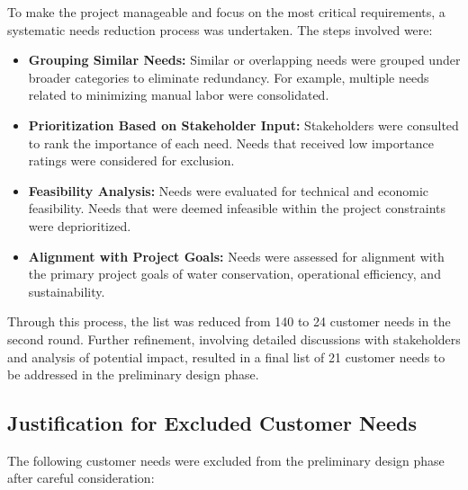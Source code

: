 \documentclass[12pt]{report}
\begin{document}
To make the project manageable and focus on the most critical requirements, a systematic needs reduction process was undertaken. The steps involved were:

\begin{itemize}
    \item \textbf{Grouping Similar Needs:} Similar or overlapping needs were grouped under broader categories to eliminate redundancy. For example, multiple needs related to minimizing manual labor were consolidated.
    \item \textbf{Prioritization Based on Stakeholder Input:} Stakeholders were consulted to rank the importance of each need. Needs that received low importance ratings were considered for exclusion.
    \item \textbf{Feasibility Analysis:} Needs were evaluated for technical and economic feasibility. Needs that were deemed infeasible within the project constraints were deprioritized.
    \item \textbf{Alignment with Project Goals:} Needs were assessed for alignment with the primary project goals of water conservation, operational efficiency, and sustainability.
\end{itemize}

Through this process, the list was reduced from 140 to 24 customer needs in the second round. Further refinement, involving detailed discussions with stakeholders and analysis of potential impact, resulted in a final list of 21 customer needs to be addressed in the preliminary design phase.

\subsection{Justification for Excluded Customer Needs}

The following customer needs were excluded from the preliminary design phase after careful consideration:
\end{document}
